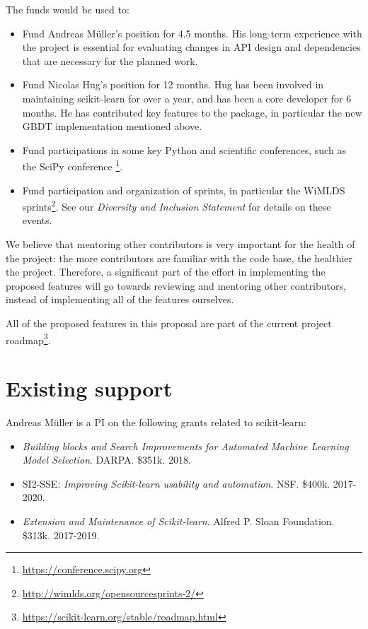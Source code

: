 \documentclass[11pt]{article}  %
\begin{document}
The funds would be used to:
\begin{itemize}
\item Fund Andreas M\"uller's position for 4.5 months. His long-term experience with the project is essential for evaluating changes in API design and dependencies that are necessary for the planned work.
\item Fund Nicolas Hug's position for 12 months. Hug has been involved in
maintaining scikit-learn for over a year, and has been a core developer for 6 months. He has contributed key features
to the package, in particular the new GBDT implementation mentioned above.
\item Fund participations in some key Python and scientific conferences,
such as the SciPy conference
\footnote{\href{https://conference.scipy.org/}{https://conference.scipy.org}}.
\item Fund participation and organization of sprints, in particular the WiMLDS sprints\footnote{\href{http://wimlds.org/opensourcesprints-2/}{http://wimlds.org/opensourcesprints-2/}}. See our \textit{Diversity and Inclusion Statement} for details on these events.
\end{itemize}

We believe that mentoring other contributors is very important for the
health of the project: the more contributors are familiar with the code
base, the healthier the project. Therefore, a significant part of the effort in
implementing the proposed features will go towards reviewing and
mentoring other contributors, instead of implementing all of the features
ourselves.

All of the proposed features in this proposal are part of the current
project
roadmap\footnote{\href{https://scikit-learn.org/stable/roadmap.html}{https://scikit-learn.org/stable/roadmap.html}}.


\section{Existing support}

 Andreas M\"uller is a PI on the following grants related to scikit-learn:

\begin{itemize}
    \item \textit{Building blocks and Search Improvements for Automated Machine Learning Model Selection}. DARPA. \$351k.  2018.
    \item SI2-SSE: \textit{Improving Scikit-learn usability and automation}. NSF. \$400k.  2017-2020.
    \item \textit{Extension and Maintenance of Scikit-learn}. Alfred P. Sloan Foundation. \$313k.  2017-2019.
\end{itemize}
\end{document}
